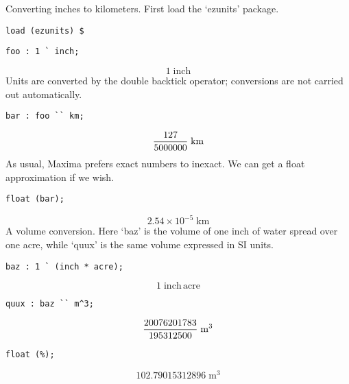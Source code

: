 \documentclass[12pt]{article}
\begin{document}
Converting inches to kilometers.
First load the `ezunits' package.
\begin{verbatim}
load (ezunits) $
\end{verbatim}
\begin{verbatim}
foo : 1 ` inch;
\end{verbatim}
$$1\;\mathrm{inch}$$
Units are converted by the double backtick operator; conversions are not carried out automatically.
\begin{verbatim}
bar : foo `` km;
\end{verbatim}
$${{127}\over{5000000}}\;\mathrm{km}$$
As usual, Maxima prefers exact numbers to inexact. 
We can get a float approximation if we wish.
\begin{verbatim}
float (bar);
\end{verbatim}
$$2.54 \times 10^{-5}\;\mathrm{km}$$
A volume conversion. 
Here `baz' is the volume of one inch of water spread over one acre, while `quux' is the same volume expressed in SI units.
\begin{verbatim}
baz : 1 ` (inch * acre);
\end{verbatim}
$$1\;\mathrm{inch}\,\mathrm{acre}$$
\begin{verbatim}
quux : baz `` m^3;
\end{verbatim}
$${{20076201783}\over{195312500}}\;\mathrm{m}^3$$
\begin{verbatim}
float (%);
\end{verbatim}
$$102.79015312896\;\mathrm{m}^3$$
\end{document}

